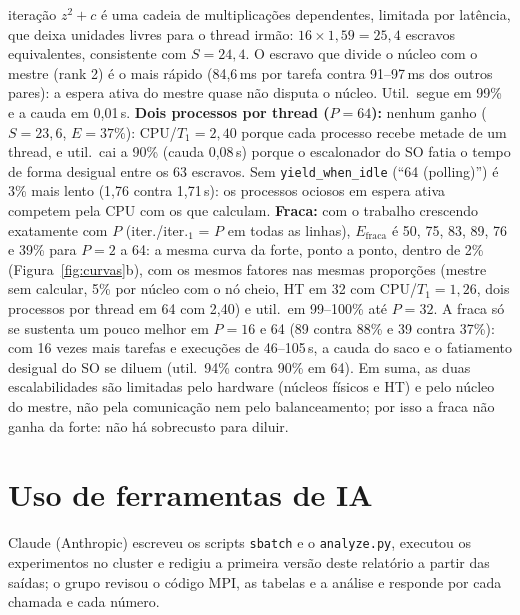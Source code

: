\documentclass[10pt,twocolumn,a4paper]{article}
\newcommand{\code}[1]{\texttt{#1}}
\begin{document}
iteração $z^2+c$ é uma cadeia de multiplicações dependentes, limitada por latência, que deixa
unidades livres para o thread irmão: $16\times1{,}59=25{,}4$ escravos equivalentes, consistente
com $S=24{,}4$. O escravo que divide o núcleo com o mestre (rank 2) é o mais rápido (84,6\,ms por
tarefa contra 91--97\,ms dos outros pares): a espera ativa do mestre quase não disputa o núcleo.
Util.\ segue em 99\% e a cauda em 0,01\,s. \textbf{Dois processos por thread ($P=64$):} nenhum
ganho ($S=23{,}6$, $E=37\%$): CPU/$T_1=2{,}40$ porque cada processo recebe metade de um thread, e
util.\ cai a 90\% (cauda 0,08\,s) porque o escalonador do SO fatia o tempo de forma desigual entre
os 63 escravos. Sem \code{yield\_when\_idle} (``64 (polling)'') é 3\% mais lento (1,76 contra
1,71\,s): os processos ociosos em espera ativa competem pela CPU com os que calculam.
\textbf{Fraca:} com o trabalho crescendo exatamente com $P$ (iter./iter.$_1$ = $P$ em todas as
linhas), $E_\text{fraca}$ é 50, 75, 83, 89, 76 e 39\% para $P=2$ a 64: a mesma curva da forte,
ponto a ponto, dentro de 2\% (Figura~\ref{fig:curvas}b), com os mesmos fatores nas mesmas
proporções (mestre sem calcular, 5\% por núcleo com o nó cheio, HT em 32 com CPU/$T_1=1{,}26$,
dois processos por thread em 64 com 2,40) e util.\ em 99--100\% até $P=32$. A fraca só se sustenta
um pouco melhor em $P=16$ e 64 (89 contra 88\% e 39 contra 37\%): com 16 vezes mais tarefas e
execuções de 46--105\,s, a cauda do saco e o fatiamento desigual do SO se diluem (util.\ 94\% contra
90\% em 64). Em suma, as duas escalabilidades são limitadas pelo hardware (núcleos físicos e HT) e
pelo núcleo do mestre, não pela comunicação nem pelo balanceamento; por isso a fraca não ganha da
forte: não há sobrecusto para diluir.

\section{Uso de ferramentas de IA}
Claude (Anthropic) escreveu os scripts \code{sbatch} e o \code{analyze.py}, executou os
experimentos no cluster e redigiu a primeira versão deste relatório a partir das saídas; o grupo
revisou o código MPI, as tabelas e a análise e responde por cada chamada e cada número.
\end{document}
